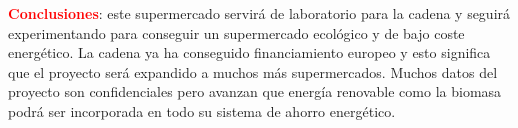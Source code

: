 \begin{multicols}{2}
\textbf{\textcolor{red}{Conclusiones}}: este supermercado servirá de laboratorio para la cadena y seguirá experimentando para conseguir un supermercado ecológico y de bajo coste energético. La cadena ya ha conseguido financiamiento europeo y esto significa que el proyecto será expandido a muchos más supermercados. Muchos datos del proyecto son confidenciales pero avanzan que energía renovable como la biomasa podrá ser incorporada en todo su sistema de ahorro energético.





\end{multicols}
